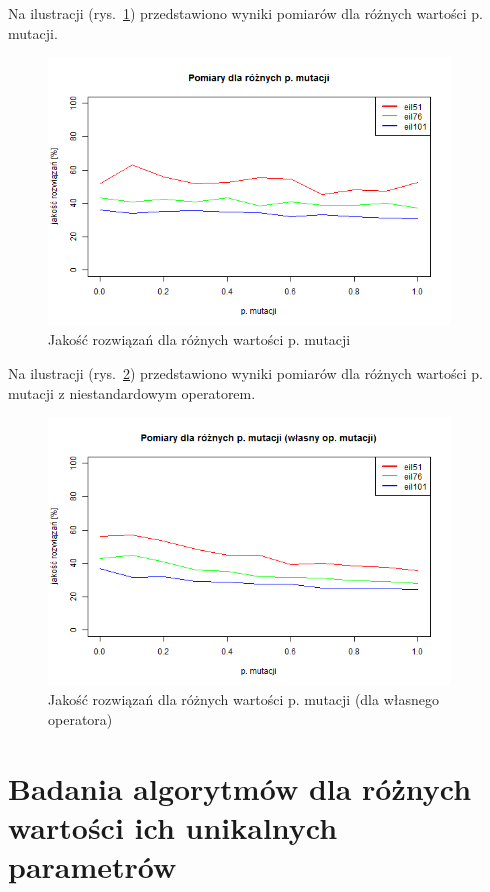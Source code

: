 \documentclass[11pt, a4paper]{article}
\newcommand{\fbi}{\leavevmode{\parindent=1em\indent}}
\begin{document}
\fbi
Na ilustracji (rys.~\ref{fig:tspmut}) przedstawiono wyniki pomiarów dla różnych wartości p. mutacji.

\begin{figure}[H]
	\centering
	\includegraphics[width=0.95\textwidth]{./assets/tsp_mut.png}
	\caption{Jakość rozwiązań dla różnych wartości p. mutacji}
	\label{fig:tspmut}
\end{figure}

\fbi
Na ilustracji (rys.~\ref{fig:tspmutcust}) przedstawiono wyniki pomiarów dla różnych wartości p. mutacji z niestandardowym operatorem.

\begin{figure}[H]
	\centering
	\includegraphics[width=0.95\textwidth]{./assets/tsp_mut_custom.png}
	\caption{Jakość rozwiązań dla różnych wartości p. mutacji (dla własnego operatora)}
	\label{fig:tspmutcust}
\end{figure}

\newpage
\section{Badania algorytmów dla różnych wartości ich unikalnych parametrów}
\end{document}
